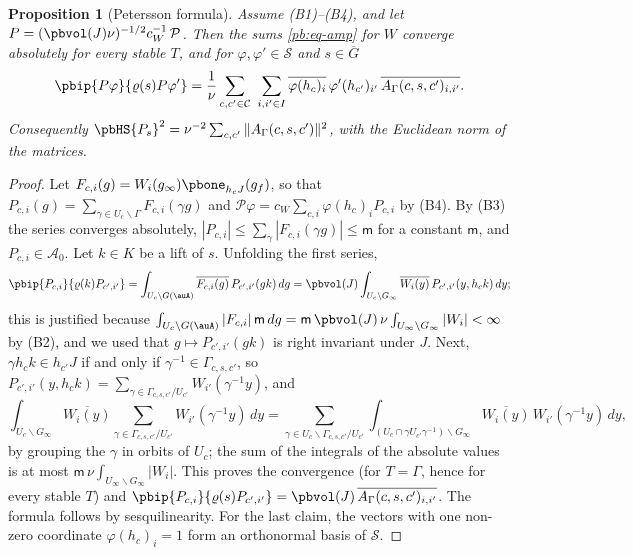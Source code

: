 \documentclass[10pt]{amsart}
\newtheorem{proposition}[theorem]{Proposition}
\theoremstyle{definition}
\theoremstyle{remark}
\providecommand{\auAz}{\mathcal A_0}
\providecommand{\auG}{\overline G}
\providecommand{\auP}{\mathcal P}
\providecommand{\auS}{\mathcal S}
\providecommand{\aubar}[1]{\overline{#1}}
\begin{document}
\begin{proposition}[Petersson formula]\label{pb:unfold}
Assume \textup{(B1)--(B4)}, and let $P=(\pbvol(J)\nu)^{-1/2}c_W^{-1}\,\auP$. Then the sums
\eqref{pb:eq-amp} for $W$ converge absolutely for every stable $T$, and for $\varphi,\varphi'\in\auS$
and $s\in\auG$
\[
\pbip{P\varphi}{\varrho(s)P\varphi'}=\frac1\nu\sum_{c,c'\in\mathcal C}\ \sum_{i,i'\in I}\aubar{\varphi(
h_c)_i}\,\varphi'(h_{c'})_{i'}\,\aubar{A_\Gamma(c,s,c')_{i,i'}} .
\]
Consequently $\pbHS{P_s}^2=\nu^{-2}\sum_{c,c'}\|A_\Gamma(c,s,c')\|^2$, with the Euclidean norm of
the matrices.
\end{proposition}
\begin{proof}
Let $F_{c,i}(g)=W_i(g_\infty)\pbone_{h_cJ}(g_f)$, so that $P_{c,i}(g)=\sum_{\gamma\in U_c\backslash
\Gamma}F_{c,i}(\gamma g)$ and $\auP\varphi=c_W\sum_{c,i}\varphi(h_c)_iP_{c,i}$ by (B4). By (B3) the
series converges absolutely, $|P_{c,i}|\le\sum_\gamma|F_{c,i}(\gamma g)|\le\mathsf m$ for a
constant $\mathsf m$, and $P_{c,i}\in\auAz$. Let $k\in K$ be a lift of $s$. Unfolding the first
series,
\[
\pbip{P_{c,i}}{\varrho(k)P_{c',i'}}=\int_{U_c\backslash G(\auA)}\aubar{F_{c,i}(g)}\,P_{c',i'}(gk)\,dg
=\pbvol(J)\int_{U_c\backslash G_\infty}\aubar{W_i(y)}\,P_{c',i'}(y,h_ck)\,dy ;
\]
this is justified because $\int_{U_c\backslash G(\auA)}|F_{c,i}|\,\mathsf m\,dg=\mathsf m\,\pbvol(J)
\,\nu\int_{U_\infty\backslash G_\infty}|W_i|<\infty$ by (B2), and we used that $g\mapsto P_{c',i'}
(gk)$ is right invariant under $J$. Next, $\gamma h_ck\in h_{c'}J$ if and only if $\gamma^{-1}\in
\Gamma_{c,s,c'}$, so $P_{c',i'}(y,h_ck)=\sum_{\gamma\in\Gamma_{c,s,c'}/U_{c'}}W_{i'}(\gamma^{-1}y)$,
and
\[
\int_{U_c\backslash G_\infty}\aubar{W_i(y)}\sum_{\gamma\in\Gamma_{c,s,c'}/U_{c'}}W_{i'}(\gamma^{-1}y)
\,dy=\sum_{\gamma\in U_c\backslash\Gamma_{c,s,c'}/U_{c'}}\int_{(U_c\cap\gamma U_{c'}\gamma^{-1})
\backslash G_\infty}\aubar{W_i(y)}\,W_{i'}(\gamma^{-1}y)\,dy ,
\]
by grouping the $\gamma$ in orbits of $U_c$; the sum of the integrals of the absolute values is at
most $\mathsf m\,\nu\int_{U_\infty\backslash G_\infty}|W_i|$. This proves the convergence (for
$T=\Gamma$, hence for every stable $T$) and $\pbip{P_{c,i}}{\varrho(s)P_{c',i'}}=\pbvol(J)\,\aubar{A_\Gamma
(c,s,c')_{i,i'}}$. The formula follows by sesquilinearity. For the last claim, the vectors with one
non-zero coordinate $\varphi(h_c)_i=1$ form an orthonormal basis of $\auS$.
\end{proof}
\end{document}
